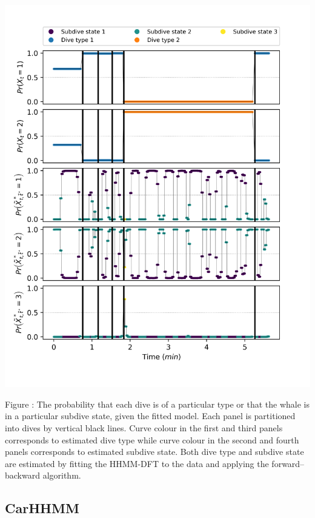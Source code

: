 \documentclass{article}
\begin{document}
        \begin{center}
        \includegraphics[width=6in]{../Plots/2019/20190902-182840-CATs_OB_1_0_267_HHMM_decoded_states.png}
        \end{center}
        
        \noindent Figure : The probability that each dive is of a particular type or that the whale is in a particular subdive state, given the fitted model. Each panel is partitioned into dives by vertical black lines. Curve colour in the first and third panels corresponds to estimated dive type while curve colour in the second and fourth panels corresponds to estimated subdive state. Both dive type and subdive state are estimated by fitting the HHMM-DFT to the data and applying the forward--backward algorithm.
        \addtocounter{fignum}{1}
        
        \subsection{CarHHMM}
        
\end{document}
